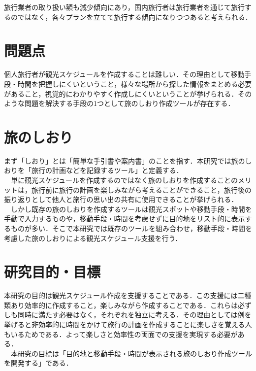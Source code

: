 \documentclass{funthesis}
\begin{document}
旅行業者の取り扱い額も減少傾向にあり，国内旅行者は旅行業者を通じて旅行するのではなく，各々プランを立てて旅行する傾向になりつつあると考えられる．


\section{問題点} %

個人旅行者が観光スケジュールを作成することは難しい．その理由として移動手段・時間を把握しにくいということ，様々な場所から探した情報をまとめる必要があること，視覚的にわかりやすく作成しにくいということが挙げられる．そのような問題を解決する手段の1つとして旅のしおり作成ツールが存在する．\\



\section{旅のしおり}
まず「しおり」とは「簡単な手引書や案内書」のことを指す．本研究では旅のしおりを「旅行の計画などを記録するツール」と定義する．\\
　単に観光スケジュールを作成するのではなく旅のしおりを作成することのメリットは，旅行前に旅行の計画を楽しみながら考えることができること，旅行後の振り返りとして他人と旅行の思い出の共有に使用できることが挙げられる．\\
　しかし既存の旅のしおりを作成するツールは観光スポットや移動手段・時間を手動で入力するものや，移動手段・時間を考慮せずに目的地をリスト的に表示するものが多い．そこで本研究では既存のツールを組み合わせ，移動手段・時間を考慮した旅のしおりによる観光スケジュール支援を行う．


\section{研究目的・目標}

本研究の目的は観光スケジュール作成を支援することである．この支援には二種類あり効率的に作成すること，楽しみながら作成することである．これらは必ずしも同時に満たす必要はなく，それぞれを独立に考える．その理由としては例を挙げると非効率的に時間をかけて旅行の計画を作成することに楽しさを覚える人もいるためである．よって楽しさと効率性の両面での支援を実現する必要がある．\\
　本研究の目標は「目的地と移動手段・時間が表示される旅のしおり作成ツールを開発する」である．


\end{document}
